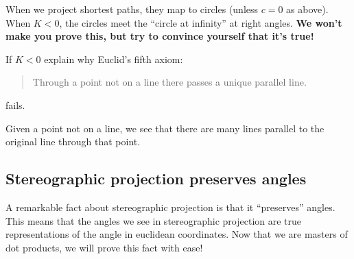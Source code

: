 \documentclass[newpage,hints,12pt,noauthor,nooutcomes]{ximera}
\begin{document}
When we project shortest paths, they map to circles (unless $c=0$ as
above).  When $K<0$, the circles meet the ``circle at infinity'' at
right angles.  \textbf{We won't make you prove this, but try to
  convince yourself that it's true!}

\begin{center}
\end{center}

\begin{problem}
  If $K<0$ explain why Euclid's fifth axiom:
  \begin{quote}
    Through a point not on a line there passes a unique parallel line.
  \end{quote}
  fails.
  \begin{freeResponse}
    Given a point not on a line, we see that there are many lines
    parallel to the original line through that point.
  \end{freeResponse}
\end{problem}







\subsection{Stereographic projection preserves angles}


A remarkable fact about stereographic projection is that it
``preserves'' angles. This means that the angles we see in
stereographic projection are true representations of the angle in
euclidean coordinates.  Now that we are masters of dot products, we
will prove this fact with ease!
\end{document}
